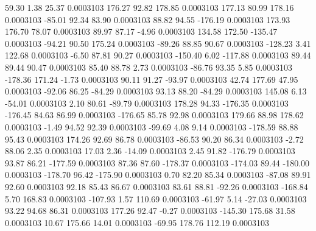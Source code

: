        59.30        1.38       25.37     0.0003103
      176.27       92.82      178.85     0.0003103
      177.13       80.99      178.16     0.0003103
      -85.01       92.34       83.90     0.0003103
       88.82       94.55     -176.19     0.0003103
      173.93      176.70       78.07     0.0003103
       89.97       87.17       -4.96     0.0003103
      134.58      172.50     -135.47     0.0003103
      -94.21       90.50      175.24     0.0003103
      -89.26       88.85       90.67     0.0003103
     -128.23        3.41      122.68     0.0003103
       -6.50       87.81       90.27     0.0003103
     -150.40        6.02     -117.88     0.0003103
       89.44       89.44       90.47     0.0003103
       85.40       88.78        2.73     0.0003103
      -86.76       93.35        5.85     0.0003103
     -178.36      171.24       -1.73     0.0003103
       90.11       91.27      -93.97     0.0003103
       42.74      177.69       47.95     0.0003103
      -92.06       86.25      -84.29     0.0003103
       93.13       88.20      -84.29     0.0003103
      145.08        6.13      -54.01     0.0003103
        2.10       80.61      -89.79     0.0003103
      178.28       94.33     -176.35     0.0003103
     -176.45       84.63       86.99     0.0003103
     -176.65       85.78       92.98     0.0003103
      179.66       88.98      178.62     0.0003103
       -1.49       94.52       92.39     0.0003103
      -99.69        4.08        9.14     0.0003103
     -178.59       88.88       95.43     0.0003103
      174.26       92.69       86.78     0.0003103
      -86.53       90.20       86.34     0.0003103
       -2.72       88.06        2.35     0.0003103
       17.03        2.36      -14.09     0.0003103
        2.45       91.82     -176.79     0.0003103
       93.87       86.21     -177.59     0.0003103
       87.36       87.60     -178.37     0.0003103
     -174.03       89.44     -180.00     0.0003103
     -178.70       96.42     -175.90     0.0003103
        0.70       82.20       85.34     0.0003103
      -87.08       89.91       92.60     0.0003103
       92.18       85.43       86.67     0.0003103
       83.61       88.81      -92.26     0.0003103
     -168.84        5.70      168.83     0.0003103
     -107.93        1.57      110.69     0.0003103
      -61.97        5.14      -27.03     0.0003103
       93.22       94.68       86.31     0.0003103
      177.26       92.47       -0.27     0.0003103
     -145.30      175.68       31.58     0.0003103
       10.67      175.66       14.01     0.0003103
      -69.95      178.76      112.19     0.0003103
